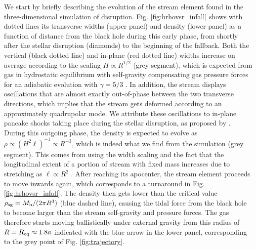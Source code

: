 \documentclass[a4paper,fleqn,usenatbib]{mnras}
\newcommand{\mh}{M_{\rm h}}
\begin{document}
We start by briefly describing the evolution of the stream element found in the three-dimensional simulation of disruption. Fig. \ref{fig:hrhovsr_infall} shows with dotted lines its transverse widths (upper panel) and density (lower panel) as a function of distance from the black hole during this early phase, from shortly after the stellar disruption (diamonds) to the beginning of the fallback. Both the vertical (black dotted line) and in-plane (red dotted line) widths increase on average according to the scaling $H \propto R^{1/2}$ (grey segment), which is expected from gas in hydrostatic equilibrium with self-gravity compensating gas pressure forces for an adiabatic evolution with $\gamma = 5/3$ \citep{coughlin2016-structure}. In addition, the stream displays oscillations that are almost exactly out-of-phase between the two transverse directions, which implies that the stream gets deformed according to an approximately quadrupolar mode. We attribute these oscillations to in-plane pancake shocks taking place during the stellar disruption, as proposed by \cite{coughlin2016-pancakes}. During this outgoing phase, the density is expected to evolve as $\rho \propto (H^2 \ell)^{-1} \propto R^{-3}$, which is indeed what we find from the simulation (grey segment). This comes from using the width scaling and the fact that the longitudinal extent of a portion of stream with fixed mass increases due to stretching as $\ell\propto R^2$ \citep{coughlin2016-structure}. After reaching its apocenter, the stream element proceeds to move inwards again, which corresponds to a turnaround in Fig. \ref{fig:hrhovsr_infall}. The density then gets lower than the critical value $\rho_{\rm sg} = \mh/(2\pi R^3)$ (blue dashed line), causing the tidal force from the black hole to become larger than the stream self-gravity and pressure forces. The gas therefore starts moving ballistically under external gravity from this radius of $R=R_{\rm eq} \approx 1.8 a$ indicated with the blue arrow in the lower panel, corresponding to the grey point of Fig. \ref{fig:trajectory}.
\end{document}
